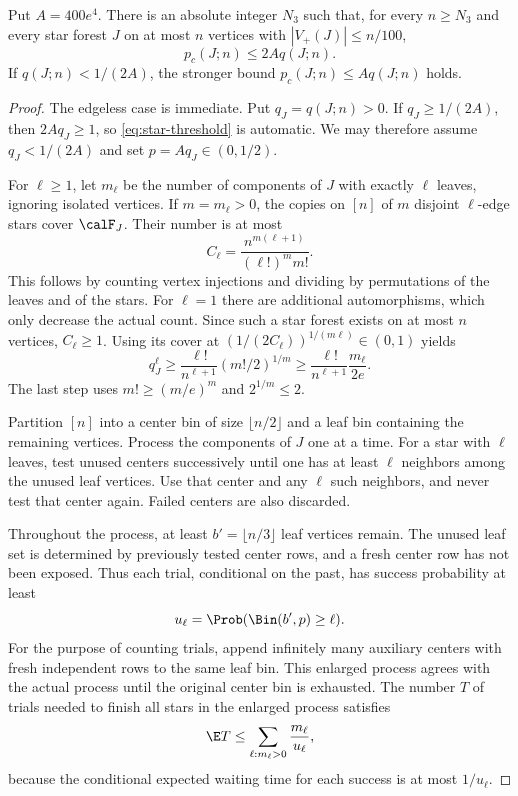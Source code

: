\begin{proposition}\label{prop:stars}
Put $A=400e^4$. There is an absolute integer $N_3$ such that,
for every $n\geq N_3$ and every star forest $J$ on at most $n$
vertices with $|V_+(J)|\leq n/100$,
\begin{equation}\label{eq:star-threshold}
 p_c(J;n)\leq2Aq(J;n).
\end{equation}
If $q(J;n)<1/(2A)$, the stronger bound
$p_c(J;n)\leq Aq(J;n)$ holds.
\end{proposition}
\begin{proof}
The edgeless case is immediate. Put $q_J=q(J;n)>0$.
If $q_J\geq1/(2A)$, then $2Aq_J\geq1$, so
\eqref{eq:star-threshold} is automatic. We may therefore
assume $q_J<1/(2A)$ and set $p=Aq_J\in(0,1/2)$.

For $\ell\geq1$, let $m_\ell$ be the number of components
of $J$ with exactly $\ell$ leaves, ignoring isolated vertices.
If $m=m_\ell>0$, the copies on $[n]$ of $m$ disjoint
$\ell$-edge stars cover $\calF_J$. Their number is at most
\[
 C_\ell=\frac{n^{m(\ell+1)}}{(\ell!)^m m!}.
\]
This follows by counting vertex injections and dividing by
permutations of the leaves and of the stars. For $\ell=1$
there are additional automorphisms, which only decrease the
actual count. Since such a star forest exists on at most $n$
vertices, $C_\ell\geq1$. Using its cover at
$(1/(2C_\ell))^{1/(m\ell)}\in(0,1)$ yields
\begin{equation}\label{eq:star-count}
 q_J^\ell\geq\frac{\ell!}{n^{\ell+1}}(m!/2)^{1/m}
 \geq\frac{\ell!}{n^{\ell+1}}\frac{m_\ell}{2e}.
\end{equation}
The last step uses $m!\geq(m/e)^m$ and $2^{1/m}\leq2$.

Partition $[n]$ into a center bin of size $\lfloor n/2\rfloor$
and a leaf bin containing the remaining vertices. Process the
components of $J$ one at a time. For a star with $\ell$ leaves,
test unused centers successively until one has at least $\ell$
neighbors among the unused leaf vertices. Use that center and
any $\ell$ such neighbors, and never test that center again.
Failed centers are also discarded.

Throughout the process, at least $b'=\lfloor n/3\rfloor$
leaf vertices remain. The unused leaf set is determined by
previously tested center rows, and a fresh center row has not
been exposed. Thus each trial, conditional on the past, has
success probability at least
\begin{equation}\label{eq:star-success}
 u_\ell=\Prob(\Bin(b',p)\geq\ell).
\end{equation}
For the purpose of counting trials, append infinitely many
auxiliary centers with fresh independent rows to the same leaf
bin. This enlarged process agrees with the actual process until
the original center bin is exhausted. The number $T$ of trials
needed to finish all stars in the enlarged process satisfies
\begin{equation}\label{eq:expected-trials}
 \E T\leq\sum_{\ell:m_\ell>0}\frac{m_\ell}{u_\ell},
\end{equation}
because the conditional expected waiting time for each success
is at most $1/u_\ell$.


\end{proof}
